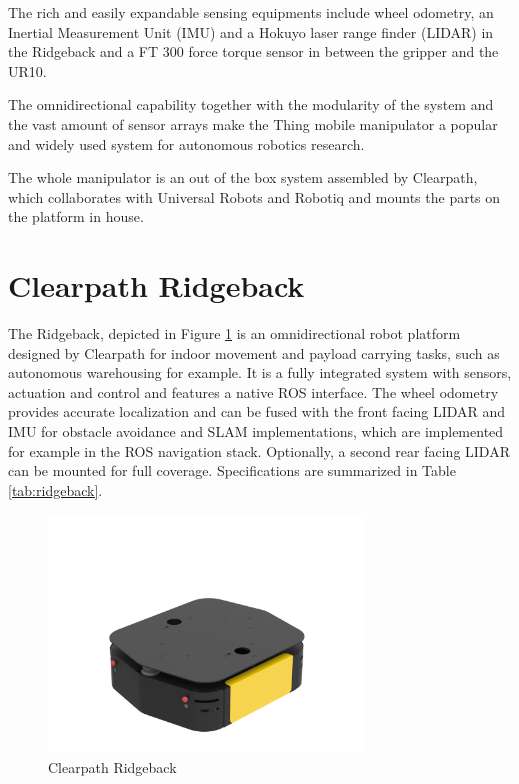 The rich and easily expandable sensing equipments include wheel odometry, an Inertial Measurement Unit (IMU) and a Hokuyo laser range finder (LIDAR) \citep{hokuyo} in the Ridgeback and a FT 300 force torque sensor \citep{robotiqFT300} in between the gripper and the UR10.

The omnidirectional capability together with the modularity of the system and the vast amount of sensor arrays make the Thing mobile manipulator a popular and widely used system for autonomous robotics research.

The whole manipulator is an out of the box system assembled by Clearpath, which collaborates with Universal Robots and Robotiq and mounts the parts on the platform in house.

\section{Clearpath Ridgeback}
	\label{sec:ridgeback}
The Ridgeback, depicted in Figure \ref{pics:ridgeback} is an omnidirectional robot platform designed by Clearpath for indoor movement and payload carrying tasks, such as autonomous warehousing for example. It is a fully integrated system with sensors, actuation and control and features a native ROS interface. The wheel odometry provides accurate localization and can be fused with the front facing LIDAR and IMU for obstacle avoidance and SLAM implementations, which are implemented for example in the ROS navigation stack. Optionally, a second rear facing LIDAR can be mounted for full \unit[360]{\textdegree} coverage. Specifications are summarized in Table \ref{tab:ridgeback}.

\begin{figure}[h]
   \centering
   \includegraphics[width=0.75\textwidth]{images/ridgeback.png}
   \caption{Clearpath Ridgeback}
   \label{pics:ridgeback}
\end{figure}

